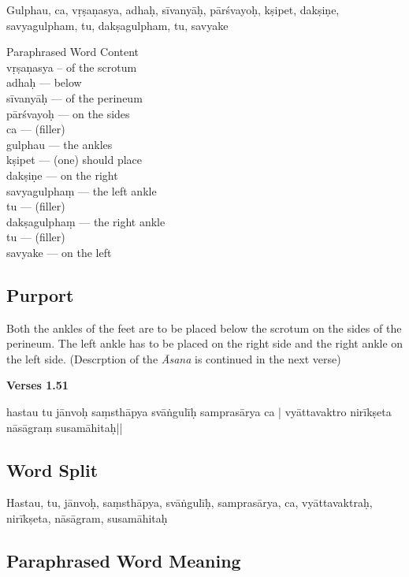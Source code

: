 Gulphau, ca, vṛṣaṇasya, adhaḥ, sīvanyāḥ, pārśvayoḥ, kṣipet, dakṣiṇe, savyagulpham, tu, dakṣagulpham, tu, savyake

\begin{multicols}{2}
Paraphrased Word Content \\
vṛṣaṇasya -- of the scrotum  \\ 
adhaḥ ---  below  \\
sīvanyāḥ ---  of the perineum  \\
pārśvayoḥ ---  on the sides  \\
ca ---  (filler) \\
gulphau ---  the ankles  \\
kṣipet ---   (one) should place  \\
dakṣiṇe --- on the right  \\
savyagulphaṃ --- the left ankle  \\
tu ---  (filler) \\
dakṣagulphaṃ ---  the right ankle  \\
tu ---  (filler) \\
savyake --- on the left 
\end{multicols}

\subsection*{Purport}


Both the ankles of the feet are to be placed below the scrotum on the sides of the perineum. The left ankle has to be placed on the right side and the right ankle on the left side. (Descrption of the \textit{Āsana} is continued in the next verse)

\newpage
\noindent \textbf{Verses 1.51}

\begin{center}
hastau tu jānvoḥ saṃsthāpya svāṅgulīḥ samprasārya ca |
vyāttavaktro nirīkṣeta nāsāgraṃ susamāhitaḥ||
\end{center}

\subsection*{Word Split}

Hastau, tu, jānvoḥ, saṃsthāpya, svāṅgulīḥ, samprasārya, ca, vyāttavaktraḥ, nirīkṣeta, nāsāgram, susamāhitaḥ

\subsection*{Paraphrased Word Meaning}

